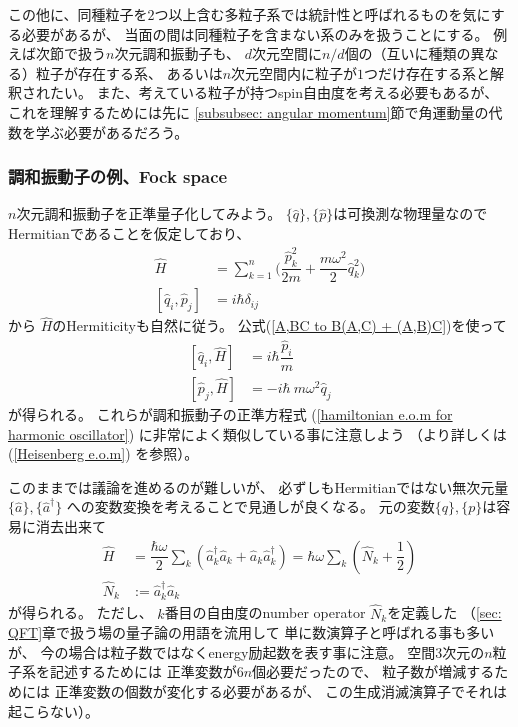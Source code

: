 この他に、同種粒子を$2$つ以上含む多粒子系では統計性と呼ばれるものを気にする必要があるが、
当面の間は同種粒子を含まない系のみを扱うことにする。
例えば次節で扱う$n$次元調和振動子も、
$d$次元空間に$n/d$個の（互いに種類の異なる）粒子が存在する系、
あるいは$n$次元空間内に粒子が$1$つだけ存在する系と解釈されたい。
また、考えている粒子が持つspin自由度を考える必要もあるが、
これを理解するためには先に
\ref{subsubsec: angular momentum}節で角運動量の代数を学ぶ必要があるだろう。

\subsubsection{調和振動子の例、Fock space}

$n$次元調和振動子を正準量子化してみよう。
$\{\hat{q}\}, \{\hat{p}\}$は可換測な物理量なのでHermitianであることを仮定しており、
\begin{align}
    \hat{H} &= \sum_{k=1}^n \bigg(
        \dfrac{ \hat{p}_k^2 }{2m}
    +
        \dfrac{ m\omega^2 }{2} \hat{q}_k^2
    \bigg)
\\
    [ \hat{q}_i , \hat{p}_j ] &= i\hbar \delta_{ij}
\end{align}
から
$\hat{H}$のHermiticityも自然に従う。
公式(\ref{A,BC to B(A,C) + (A,B)C})を使って
\begin{subequations}
\begin{align}
    [\hat{q}_i, \hat{H}] &= i\hbar \dfrac{ \hat{p}_i }{m}
\\
    [\hat{p}_j, \hat{H}] &= - i \hbar\ m\omega^2 \hat{q}_j
\end{align}
\end{subequations}
が得られる。
これらが調和振動子の正準方程式
(\ref{hamiltonian e.o.m for harmonic oscillator})
に非常によく類似している事に注意しよう
（より詳しくは
(\ref{Heisenberg e.o.m})
を参照）。

このままでは議論を進めるのが難しいが、
必ずしもHermitianではない無次元量
$\{\hat{a}\}, \{\hat{a}^\dagger\}$
への変数変換を考えることで見通しが良くなる。
元の変数$\{q\},\{p\}$は容易に消去出来て
\begin{subequations}
\begin{align}
    \hat{H}
        &=
        \dfrac{ \hbar\omega }{ 2 }
        \sum_k
        \left(
            \hat{a}^\dagger_k\hat{a}_k
            +
            \hat{a}_k\hat{a}_k^\dagger
        \right)
        =
        \hbar\omega
        \sum_k
        \left(
            \hat{N}_k
            +
            \dfrac{ 1 }{ 2 }
        \right)
\\
    \hat{N}_k &:= \hat{a}^\dagger_k\hat{a}_k
\end{align}
\end{subequations}
が得られる。
ただし、
$k$番目の自由度のnumber operator
$\hat{N}_k$を定義した
（\ref{sec: QFT}章で扱う場の量子論の用語を流用して
単に数演算子と呼ばれる事も多いが、
今の場合は粒子数ではなくenergy励起数を表す事に注意。
空間$3$次元の$n$粒子系を記述するためには
正準変数が$6n$個必要だったので、
粒子数が増減するためには
正準変数の個数が変化する必要があるが、
この生成消滅演算子でそれは起こらない）。

